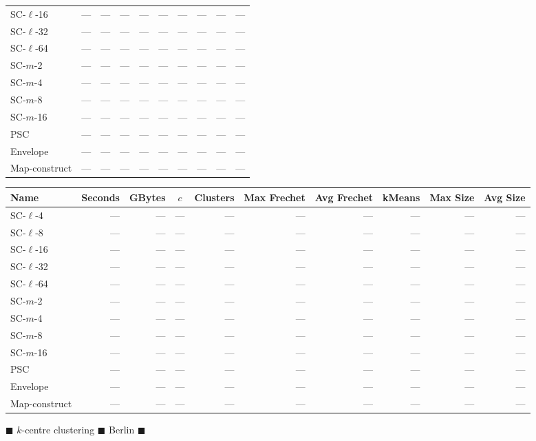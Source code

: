 \documentclass[11pt]{article}
\begin{document}
\begin{figure}
\begin{center}
\begin{minipage}{\textwidth}
{\begin{tabular}{@{}lrrcrrrrrr@{}}
        SC-$\ell$-16 & --- & --- & --- & --- & --- & --- & --- & --- & ---\\
        SC-$\ell$-32 & --- & --- & --- & --- & --- & --- & --- & --- & ---\\
        SC-$\ell$-64 & --- & --- & --- & --- & --- & --- & --- & --- & ---\\
        SC-$m$-2 & --- & --- & --- & --- & --- & --- & --- & --- & ---\\
        SC-$m$-4 & --- & --- & --- & --- & --- & --- & --- & --- & ---\\
        SC-$m$-8 & --- & --- & --- & --- & --- & --- & --- & --- & ---\\
        SC-$m$-16 & --- & --- & --- & --- & --- & --- & --- & --- & ---\\
        PSC & --- & --- & --- & --- & --- & --- & --- & --- & ---\\
        Envelope & --- & --- & --- & --- & --- & --- & --- & --- & ---\\
        Map-construct & --- & --- & --- & --- & --- & --- & --- & --- & ---\\
        \bottomrule
    \end{tabular}
    }
    {
    \begin{tabular}{@{}lrrcrrrrrr@{}}
        \toprule
        Name & Seconds & GBytes & $c$ & Clusters & Max Frechet & Avg Frechet & kMeans & Max Size & Avg Size\\
        \midrule
        SC-$\ell$-4 & --- & --- & --- & --- & --- & --- & --- & --- & ---\\
        SC-$\ell$-8 & --- & --- & --- & --- & --- & --- & --- & --- & ---\\
        SC-$\ell$-16 & --- & --- & --- & --- & --- & --- & --- & --- & ---\\
        SC-$\ell$-32 & --- & --- & --- & --- & --- & --- & --- & --- & ---\\
        SC-$\ell$-64 & --- & --- & --- & --- & --- & --- & --- & --- & ---\\
        SC-$m$-2 & --- & --- & --- & --- & --- & --- & --- & --- & ---\\
        SC-$m$-4 & --- & --- & --- & --- & --- & --- & --- & --- & ---\\
        SC-$m$-8 & --- & --- & --- & --- & --- & --- & --- & --- & ---\\
        SC-$m$-16 &--- & --- & --- & --- & --- & --- & --- & --- & ---\\
        PSC & --- & --- & --- & --- & --- & --- & --- & --- & ---\\
        Envelope & --- & --- & --- & --- & --- & --- & --- & --- & ---\\
        Map-construct & --- & --- & --- & --- & --- & --- & --- & --- & ---\\
        \bottomrule
    \end{tabular}
    }
    \end{minipage}
%
        \caption{$\blacksquare$ $k$-centre clustering $\blacksquare$ Berlin   $\blacksquare$}
    \end{center} \end{figure}
\end{document}

